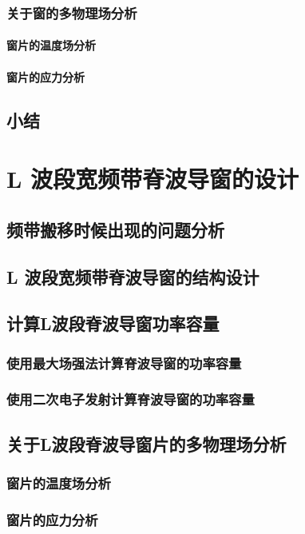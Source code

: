 \documentclass[master]{thesis-uestc}
\begin{document}
\subsection{关于窗的多物理场分析}
\subsubsection{窗片的温度场分析}
\subsubsection{窗片的应力分析}
\section{小结}
\chapter{L 波段宽频带脊波导窗的设计}
\section{频带搬移时候出现的问题分析}

\section{L 波段宽频带脊波导窗的结构设计}

\section{计算L波段脊波导窗功率容量}
\subsection{使用最大场强法计算脊波导窗的功率容量}
\subsection{使用二次电子发射计算脊波导窗的功率容量}
\section{关于L波段脊波导窗片的多物理场分析}
\subsection{窗片的温度场分析}
\subsection{窗片的应力分析}
\end{document}
